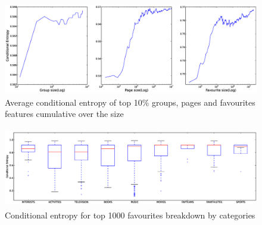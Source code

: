 \begin{figure}[tbp!]
\centering
\includegraphics[width=160mm,height=40mm]{data/plots/cumulativeEntropy/cumulative.eps}
\caption{Average conditional entropy of top 10\% groups, pages and favourites features cumulative over the size }
\label{Fig4}
\end{figure}

\begin{figure}[tbp!]
\centering
\includegraphics[width=180mm, height=35mm]{data/plots/boxPlots/CEvsFavTypes.eps}
\caption{Conditional entropy for top 1000 favourites breakdown by categories}
\label{Fig5}
\end{figure}

